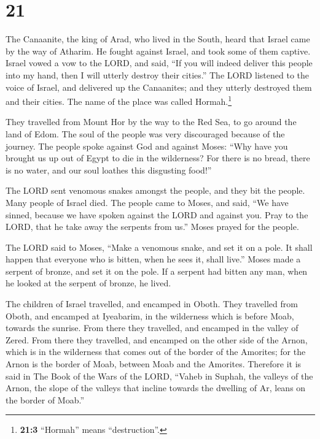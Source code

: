 \hypertarget{section-20}{%
\section{21}\label{section-20}}

 The Canaanite, the king of Arad, who lived in the South,
heard that Israel came by the way of Atharim. He fought against Israel,
and took some of them captive.  Israel vowed a vow to the
LORD, and said, ``If you will indeed deliver this people into my hand,
then I will utterly destroy their cities.''  The LORD
listened to the voice of Israel, and delivered up the Canaanites; and
they utterly destroyed them and their cities. The name of the place was
called Hormah.\footnote{\textbf{21:3} ``Hormah'' means ``destruction''.}

 They travelled from Mount Hor by the way to the Red Sea,
to go around the land of Edom. The soul of the people was very
discouraged because of the journey.  The people spoke
against God and against Moses: ``Why have you brought us up out of Egypt
to die in the wilderness? For there is no bread, there is no water, and
our soul loathes this disgusting food!''

 The LORD sent venomous snakes amongst the people, and
they bit the people. Many people of Israel died.  The
people came to Moses, and said, ``We have sinned, because we have spoken
against the LORD and against you. Pray to the LORD, that he take away
the serpents from us.'' Moses prayed for the people.

 The LORD said to Moses, ``Make a venomous snake, and set
it on a pole. It shall happen that everyone who is bitten, when he sees
it, shall live.''  Moses made a serpent of bronze, and set
it on the pole. If a serpent had bitten any man, when he looked at the
serpent of bronze, he lived.

 The children of Israel travelled, and encamped in Oboth.
 They travelled from Oboth, and encamped at Iyeabarim, in
the wilderness which is before Moab, towards the sunrise.
 From there they travelled, and encamped in the valley of
Zered.  From there they travelled, and encamped on the
other side of the Arnon, which is in the wilderness that comes out of
the border of the Amorites; for the Arnon is the border of Moab, between
Moab and the Amorites.  Therefore it is said in The Book
of the Wars of the LORD, ``Vaheb in Suphah, the valleys of the Arnon,
 the slope of the valleys that incline towards the
dwelling of Ar, leans on the border of Moab.''

